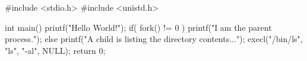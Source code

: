 \documentclass[varwidth=30.5em,crop]{standalone}
\begin{document}
\begin{ccode}
#include <stdio.h> 
#include <unistd.h> 

int main() 
{ 
  printf("Hello World!\n"); 
  if( fork() != 0 )
    printf("I am the parent process.\n");
  else {
    printf("A child is listing the directory contents...\n");    
    execl("/bin/ls", "ls", "-al", NULL);
  }
  return 0;
}  
\end{ccode}
\end{document}
